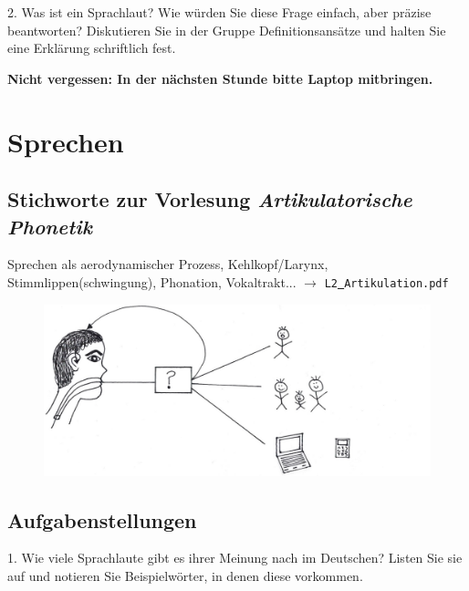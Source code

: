 \documentclass[11pt]{book}
\begin{document}
2.	Was ist ein Sprachlaut? Wie würden Sie diese Frage einfach, aber präzise beantworten? Diskutieren Sie in der Gruppe Definitionsansätze und halten Sie eine Erklärung schriftlich fest.
\vspace*{5cm}




\textbf{Nicht vergessen: In der nächsten Stunde bitte Laptop mitbringen.}


\chapter{Sprechen}

\section{Stichworte zur Vorlesung \em{Artikulatorische Phonetik}} 

Sprechen als aerodynamischer Prozess, Kehlkopf/Larynx, Stimmlippen(schwingung), Phonation, Vokaltrakt... $\rightarrow$ {\tt L2\underline{\ }Artikulation.pdf}

\begin{figure}[htbp]
\begin{center}
\includegraphics[width=\textwidth]{grafiken/sprechen/sprechen}
\label{t1}
\end{center}
\end{figure}



\section{Aufgabenstellungen}

1.	Wie viele Sprachlaute gibt es ihrer Meinung nach im Deutschen? Listen Sie sie auf und notieren Sie Beispielwörter, in denen diese vorkommen.
\vspace*{7cm}
\end{document}
